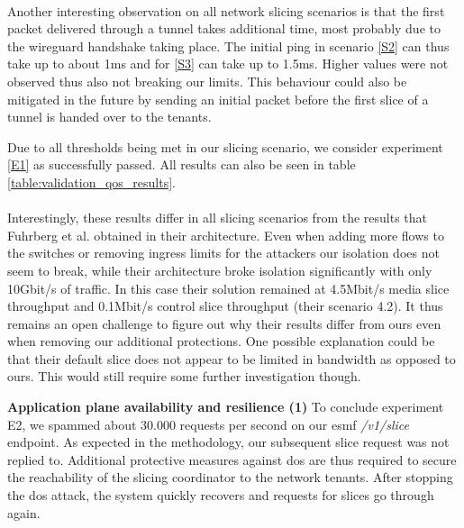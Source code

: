 \begin{description}[style=multiline, labelwidth=0.7cm]
    \paragraph{} Another interesting observation on all network slicing scenarios is that the first packet delivered through a tunnel takes additional time, most probably due to the wireguard handshake taking place. The initial ping in scenario \ref{S2} can thus take up to about 1ms and for \ref{S3} can take up to 1.5ms. Higher values were not observed thus also not breaking our limits. This behaviour could also be mitigated in the future by sending an initial packet before the first slice of a tunnel is handed over to the tenants.

    Due to all thresholds being met in our slicing scenario, we consider experiment \ref{E1} as successfully passed. All results can also be seen in table \ref{table:validation_qos_results}.

    \paragraph{} Interestingly, these results differ in all slicing scenarios from the results that Fuhrberg et al. \cite{SE4} obtained in their architecture. Even when adding more flows to the switches or removing ingress limits for the attackers our isolation does not seem to break, while their architecture broke isolation significantly with only 10Gbit/s of traffic. In this case their solution remained at 4.5Mbit/s media slice throughput and 0.1Mbit/s control slice throughput (their scenario 4.2). It thus remains an open challenge to figure out why their results differ from ours even when removing our additional protections. One possible explanation could be that their default slice does not appear to be limited in bandwidth as opposed to ours. This would still require some further investigation though.


   \item[\ref{E2}] \textbf{Application plane availability and resilience (1)} To conclude experiment E2, we spammed about 30.000 requests per second on our \acrshort{esmf} \textit{/v1/slice} endpoint. As expected in the methodology, our subsequent slice request was not replied to. Additional protective measures against \acrshort{dos} are thus required to secure the reachability of the slicing coordinator to the network tenants. After stopping the \acrshort{dos} attack, the system quickly recovers and requests for slices go through again.


\end{description}
